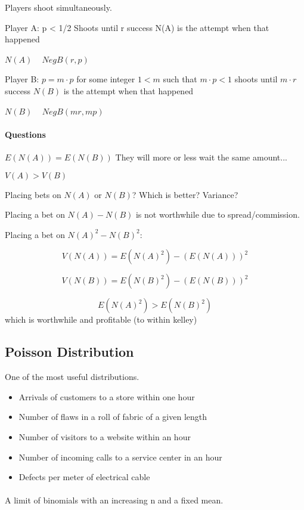 \documentclass[a4paper]{article}
\begin{document}
Players shoot simultaneously.

Player A:
p < 1/2
Shoots until r success
N(A) is the attempt when that happened

$N(A)$ ~ $NegB(r,p)$

Player B:
$p = m\cdot p$ for some integer $1<m$ such that $m\cdot p < 1$
shoots until $m\cdot r$ success
$N(B)$ is the attempt when that happened

$N(B)$ ~ $NegB(mr,mp)$

\paragraph{Questions}

$E(N(A))=E(N(B))$
They will more or less wait the same amount...

$V(A) > V(B)$

Placing bets on $N(A)$ or $N(B)$? Which is better? Variance?

Placing a bet on $N(A)-N(B)$ is not worthwhile due to spread/commission.

Placing a bet on $N(A)^2-N(B)^2$:

\[
V(N(A))=E(N(A)^2)-(E(N(A)))^2
\]

\[
V(N(B))=E(N(B)^2)-(E(N(B)))^2
\]

\[
E(N(A)^2)>E(N(B)^2)
\]
which is worthwhile and profitable (to within kelley)

\subsection{Poisson Distribution}

One of the most useful distributions.

\begin{itemize}
  \item Arrivals of customers to a store within one hour
  \item Number of flaws in a roll of fabric of a given length
  \item Number of visitors to a website within an hour
  \item Number of incoming calls to a service center in an hour
  \item Defects per meter of electrical cable
\end{itemize}

\paragraph{}
A limit of binomials with an increasing n and a fixed mean.
\end{document}
